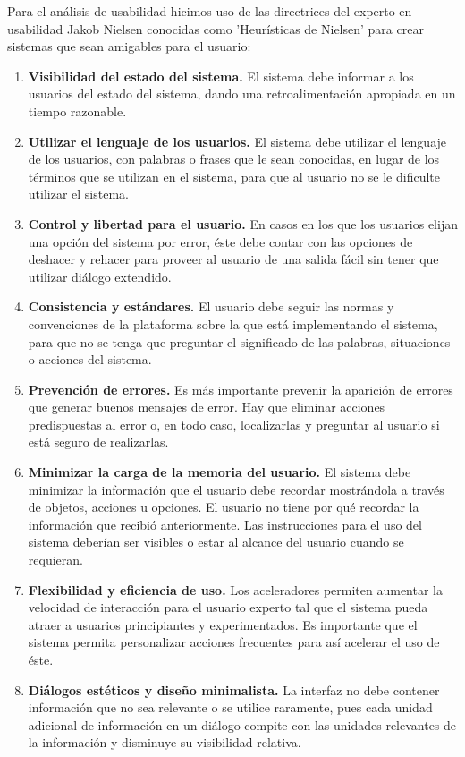 Para el análisis de usabilidad hicimos uso de las directrices del experto en usabilidad Jakob Nielsen \cite{jakonielsen} conocidas como 'Heurísticas de Nielsen' para crear sistemas que sean amigables para el usuario:

\begin{enumerate}
\item \textbf{Visibilidad del estado del sistema.} El sistema debe informar a los usuarios del estado del sistema, dando una retroalimentación apropiada en un tiempo razonable.
\item \textbf{Utilizar el lenguaje de los usuarios.} El sistema debe utilizar el lenguaje de los usuarios, con palabras o frases que le sean conocidas, en lugar de los términos que se utilizan en el sistema, para que al usuario no se le dificulte utilizar el sistema.
\item \textbf{Control y libertad para el usuario.} En casos en los que los usuarios elijan una opción del sistema por error, éste debe contar con las opciones de deshacer y rehacer para proveer al usuario de una salida fácil sin tener que utilizar diálogo extendido.
\item \textbf{Consistencia y estándares.} El usuario debe seguir las normas y convenciones de la plataforma sobre la que está implementando el sistema, para que no se tenga que preguntar el significado de las palabras, situaciones o acciones del sistema.
\item \textbf{Prevención de errores.} Es más importante prevenir la aparición de errores que generar buenos mensajes de error. Hay que eliminar acciones predispuestas al error o, en todo caso, localizarlas y preguntar al usuario si está seguro de realizarlas.
\item \textbf{Minimizar la carga de la memoria del usuario.} El sistema debe minimizar la información que el usuario debe recordar mostrándola a través de objetos, acciones u opciones. El usuario no tiene por qué recordar la información que recibió anteriormente. Las instrucciones para el uso del sistema deberían ser visibles o estar al alcance del usuario cuando se requieran.
\item \textbf{Flexibilidad y eficiencia de uso.} Los aceleradores permiten aumentar la velocidad de interacción para el usuario experto tal que el sistema pueda atraer a usuarios principiantes y experimentados. Es importante que el sistema permita personalizar acciones frecuentes para así acelerar el uso de éste.
\item \textbf{Diálogos estéticos y diseño minimalista.} La interfaz no debe contener información que no sea relevante o se utilice raramente, pues cada unidad adicional de información en un diálogo compite con las unidades relevantes de la información y disminuye su visibilidad relativa.

\end{enumerate}
